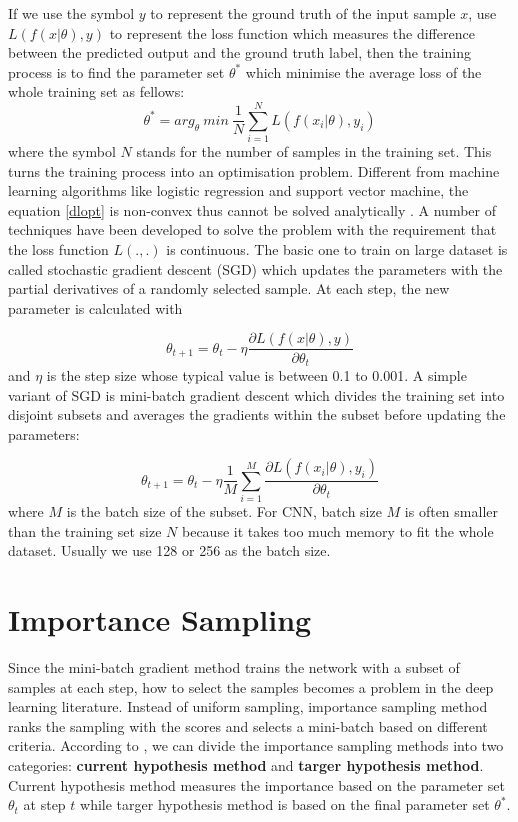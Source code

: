 If we use the symbol $y$ to represent the ground truth of the input sample $x$, use $L(f(x|\theta), y)$ to represent the loss function which measures the difference between the predicted output and the ground truth label, then the training process is to find the parameter set $\theta^*$ which minimise the average loss of the whole training set as fellows:
\begin{equation}
\label{dlopt}
\theta^* = arg_{\theta}\ min\ \frac{1}{N}\sum^{N}_{i=1}L(f(x_i|\theta), y_i)
\end{equation}
where the symbol $N$ stands for the number of samples in the training set. This turns the training process into an optimisation problem. Different from machine learning algorithms like logistic regression and support vector machine, the equation \ref{dlopt} is non-convex thus cannot be solved analytically \cite[p.~304]{Courville2016}. A number of techniques have been developed to solve the problem with the requirement that the loss function $L(.,.)$ is continuous. The basic one to train on large dataset is called stochastic gradient descent (SGD) which updates the parameters with the partial derivatives of a randomly selected sample. At each step, the new parameter is calculated with 

\begin{equation}
	\theta_{t+1} = \theta_t - \eta
 \frac{\partial{L(f(x|\theta), y)}}{\partial{\theta_t}}
\end{equation}
and $\eta$ is the step size whose typical value is between 0.1 to 0.001. A simple variant of SGD is mini-batch gradient descent which divides the training set into disjoint subsets and averages the gradients within the subset before updating the parameters:

\begin{equation}
	\theta_{t+1} = \theta_t - \eta \frac{1}{M} \sum_{i=1}^{M}
 \frac{\partial{L(f(x_i|\theta), y_i)}}{\partial{\theta_t}}
\end{equation}
where $M$ is the batch size of the subset. For CNN, batch size $M$ is often smaller than the training set size $N$ because it takes too much memory to fit the whole dataset. Usually we use 128 or 256 as the batch size. 

\section{Importance Sampling}
Since the mini-batch gradient method trains the network with a subset of samples at each step, how to select the samples becomes a problem in the deep learning literature. Instead of uniform sampling, importance sampling method ranks the sampling with the scores and selects a mini-batch based on different criteria. According to \cite{Hacohen2019a}, we can divide the importance sampling methods into two categories: \textbf{current hypothesis method} and \textbf{targer hypothesis method}. Current hypothesis method measures the importance based on the parameter set $\theta_t$ at step $t$ while targer hypothesis method is based on the final parameter set $\theta^*$. 

